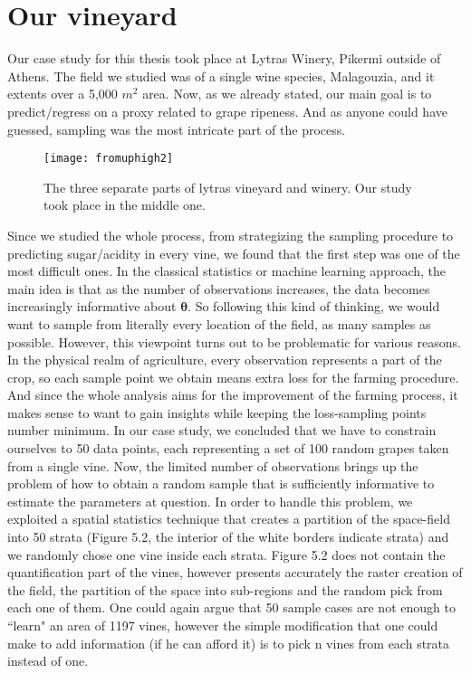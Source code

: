 \documentclass[12pt,a4paper,oneside]{book}
\theoremstyle{plain}
\theoremstyle{definition}
\begin{document}
{\chapter{Our vineyard}
Our case study for this thesis took place at Lytras Winery, Pikermi outside of Athens. The field we studied was of a single wine species, Malagouzia, and it extents over a 5,000 $m^2$ area. Now, as we already stated, our main goal is to predict/regress on a proxy related to grape ripeness. And as anyone could have guessed, sampling was the most intricate part of the process. 
\begin{figure}[h]
\begin{center}
\texttt{[image: fromuphigh2]}
\caption{The three separate parts of lytras vineyard and winery. Our study took place in the middle one.}
\end{center}
\end{figure}
\vspace{3mm}

\noindent
Since we studied the whole process, from strategizing the sampling procedure to predicting sugar/acidity in every vine, we found that the first step was one of the most difficult ones. In the classical statistics or machine learning approach, the main idea is that as the number of observations increases, the data becomes increasingly informative about $\bm{\theta}$.  So following this kind of thinking, we would want to sample from literally every location of the field, as many samples as possible. However, this viewpoint turns out to be problematic for various reasons. In the physical realm of agriculture, every observation represents a part of the crop, so each sample point we obtain means extra loss for the farming procedure.  And since the whole analysis aims for the improvement of the farming process, it makes sense to want to gain insights while keeping the loss-sampling points number minimum. In our case study, we concluded that we have to constrain ourselves to 50 data points, each representing a set of 100 random grapes taken from a single vine. Now, the limited number of observations brings up the problem of how to obtain a random sample that is sufficiently informative to estimate the parameters at question. In order to handle this problem, we exploited a spatial statistics technique that creates a partition of the space-field into 50 strata (Figure 5.2, the interior of the white borders indicate strata) and we randomly chose one vine inside each strata. Figure 5.2 does not contain the quantification part of the vines, however presents accurately the raster creation of the field, the partition of the space into sub-regions and the random pick from each one of them. One could again argue that 50 sample cases are not enough to ``learn" an area of 1197 vines, however the simple modification that one could make to add information (if he can afford it) is to pick n vines from each strata instead of one. 

}
\end{document}
